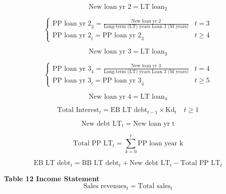 \documentclass[12pt]{article}
\numberwithin{equation}{section}
\begin{document}
\begin{equation}
	\text{New loan yr 2} = \text{LT loan}_{2}
\end{equation}

\begin{equation}
	\begin{cases}
		\text{PP loan yr 2}_{3} = \frac{\text{New loan yr 2}}{\text{Long-term (LT) years Loan 3 (M years)}} & t = 3 \\
		\text{PP loan yr 2}_{t} = \text{PP loan yr 2}_{3} & t \geq 4
	\end{cases}
\end{equation}

\begin{equation}
	\text{New loan yr 3} = \text{LT loan}_{3}
\end{equation}

\begin{equation}
	\begin{cases}
		\text{PP loan yr 3}_{4} = \frac{\text{New loan yr 3}}{\text{Long-term (LT) years Loan 3 (M years)}} & t = 4 \\
		\text{PP loan yr 3}_{t} = \text{PP loan yr 3}_{4} & t \geq 5
	\end{cases}
\end{equation}

\begin{equation}
	\text{New loan yr 4} = \text{LT loan}_{4}
\end{equation}

\begin{equation}
	\text{Total Interest}_{t} = \text{EB LT debt}_{t-1} \times \text{Kd}_{t} \quad t \geq 1
\end{equation}

\begin{equation}
	\text{New debt LT}_{t} = \text{New loan yr t}
\end{equation}

\begin{equation}
	\text{Total PP LT}_{t} = \sum_{k=0}^{t}\text{PP loan year k}
\end{equation}

\begin{equation}
	\text{EB LT debt}_{t} = \text{BB LT debt}_{t} +  \text{New debt LT}_{t} - \text{Total PP LT}_{t}
\end{equation}


\textbf{Table 12 Income Statement}
\begin{equation}
	\text{Sales revenues}_{t} = \text{Total sales}_{t}
\end{equation}
\end{document}

